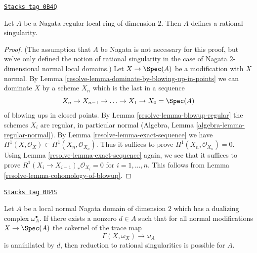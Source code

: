 \begin{lemma}
\label{resolve-lemma-regular-rational}
\href{https://stacks.math.columbia.edu/tag/0B4Q}{\texttt{Stacks tag 0B4Q}}

Let $A$ be a Nagata regular local ring of dimension $2$. Then $A$ defines
a rational singularity.
\end{lemma}

\begin{proof}

(The assumption that $A$ be Nagata is not necessary for this proof,
but we've only defined the notion of rational singularity in the
case of Nagata $2$-dimensional normal local domains.)
Let $X \to \Spec(A)$ be a modification with $X$ normal. By
Lemma \ref{resolve-lemma-dominate-by-blowing-up-in-points}
we can dominate $X$ by a scheme $X_n$ which is the last in a sequence
$$
X_n \to X_{n - 1} \to \ldots \to X_1 \to X_0 = \Spec(A)
$$
of blowing ups in closed points. By Lemma \ref{resolve-lemma-blowup-regular}
the schemes $X_i$ are regular, in particular
normal (Algebra, Lemma \ref{algebra-lemma-regular-normal}).
By Lemma \ref{resolve-lemma-exact-sequence} we have
$H^1(X, \mathcal{O}_X) \subset H^1(X_n, \mathcal{O}_{X_n})$.
Thus it suffices to prove $H^1(X_n, \mathcal{O}_{X_n}) = 0$.
Using Lemma \ref{resolve-lemma-exact-sequence} again, we
see that it suffices to prove $R^1(X_i \to X_{i - 1})_*\mathcal{O}_{X_i} = 0$
for $i = 1, \ldots, n$. This follows from
Lemma \ref{resolve-lemma-cohomology-of-blowup}.
\end{proof}

\begin{lemma}
\label{resolve-lemma-bound-dualizing-implies-bound}
\href{https://stacks.math.columbia.edu/tag/0B4S}{\texttt{Stacks tag 0B4S}}

Let $A$ be a local normal Nagata domain of dimension $2$ which has a
dualizing complex $\omega_A^\bullet$. If there exists a nonzero $d \in A$
such that for all normal modifications $X \to \Spec(A)$ the cokernel of the
trace map
$$
\Gamma(X, \omega_X) \to \omega_A
$$
is annihilated by $d$, then reduction to rational singularities
is possible for $A$.
\end{lemma}

